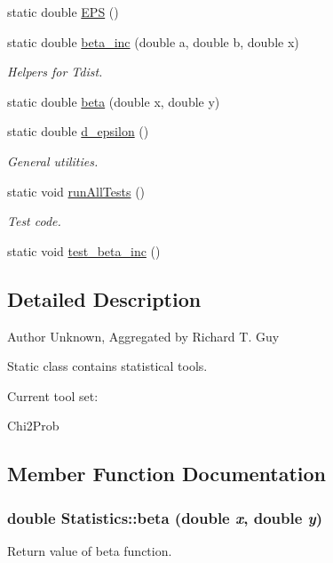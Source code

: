 \begin{DoxyCompactItemize}
\item 
static double \hyperlink{classStatistics_a5ad507e0d20b4af70a7691d6ad0ef1a0}{EPS} ()
\item 
static double \hyperlink{classStatistics_a5ba99c9fa2e04ab87c0bb9fb82b36971}{beta\_\-inc} (double a, double b, double x)
\begin{DoxyCompactList}\small\item\em Helpers for Tdist. \item\end{DoxyCompactList}\item 
static double \hyperlink{classStatistics_a8117a4ebebc8b50c8d3dde0b7d2bc859}{beta} (double x, double y)
\item 
static double \hyperlink{classStatistics_a51af50a7c894127977d718981c54b728}{d\_\-epsilon} ()
\begin{DoxyCompactList}\small\item\em General utilities. \item\end{DoxyCompactList}\item 
static void \hyperlink{classStatistics_a7d81d74eba1f1708c0c794f7f2a47b5e}{runAllTests} ()
\begin{DoxyCompactList}\small\item\em Test code. \item\end{DoxyCompactList}\item 
static void \hyperlink{classStatistics_a35a1a03a8cd3ffe80c09518d1972f148}{test\_\-beta\_\-inc} ()
\end{DoxyCompactItemize}


\subsection{Detailed Description}
\begin{DoxyAuthor}{Author}
Unknown, Aggregated by Richard T. Guy
\end{DoxyAuthor}
Static class contains statistical tools.

Current tool set:

Chi2Prob 

\subsection{Member Function Documentation}
\hypertarget{classStatistics_a8117a4ebebc8b50c8d3dde0b7d2bc859}{
\subsubsection[{beta}]{\setlength{\rightskip}{0pt plus 5cm}double Statistics::beta (double {\em x}, \/  double {\em y})}}
\label{classStatistics_a8117a4ebebc8b50c8d3dde0b7d2bc859}
Return value of beta function.

